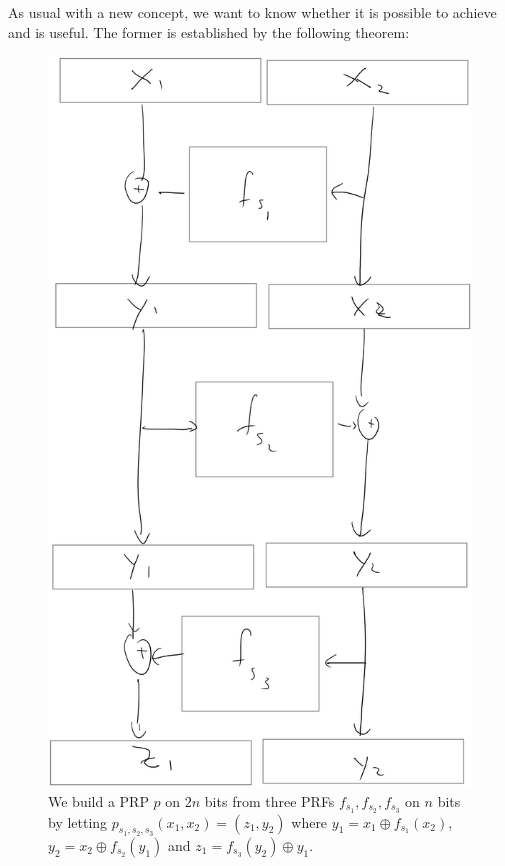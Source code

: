 As usual with a new concept, we want to know whether it is possible to
achieve and is useful. The former is established by the following
theorem:

\hypertarget{PRPfromPRF}{}


\begin{figure}
\centering
\includegraphics[width=\textwidth, height=0.25\paperheight, keepaspectratio]{../figure/feistel.jpg}
\caption{We build a PRP \(p\) on \(2n\) bits from three PRFs
\(f_{s_1},f_{s_2},f_{s_3}\) on \(n\) bits by letting
\(p_{s_1,s_2,s_3}(x_1,x_2)=(z_1,y_2)\) where
\(y_1 = x_1 \oplus f_{s_1}(x_2)\), \(y_2 = x_2 \oplus f_{s_2}(y_1)\) and
\(z_1 = f_{s_3}(y_2) \oplus y_1\).}
\label{feistelfig}
\end{figure}

